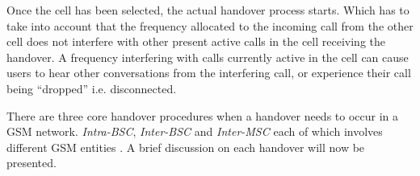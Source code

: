 Once the cell has been selected, the actual handover process starts. Which has to take into account that the frequency allocated to the incoming call from the other cell does not interfere with other present active calls in the cell receiving the handover\cite{Eisenblatter,GSMArchitectureProtocolsServices,wirelesstelcoMullet}. A frequency interfering with calls currently active in the cell can cause users to hear other conversations from the interfering call, or experience their call being ``dropped'' i.e. disconnected\cite{Eisenblatter}. 

There are three core handover procedures when a handover needs to occur in a GSM network. \emph{Intra-BSC}, \emph{Inter-BSC} and \emph{Inter-MSC} each of which involves different GSM entities \cite{wirelesstelcoMullet}. A brief discussion on each handover will now be presented.

